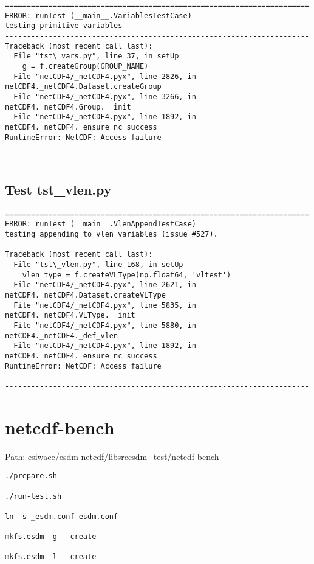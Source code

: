 \begin{verbatim}
======================================================================
ERROR: runTest (__main__.VariablesTestCase)
testing primitive variables
----------------------------------------------------------------------
Traceback (most recent call last):
  File "tst\_vars.py", line 37, in setUp
    g = f.createGroup(GROUP_NAME)
  File "netCDF4/_netCDF4.pyx", line 2826, in netCDF4._netCDF4.Dataset.createGroup
  File "netCDF4/_netCDF4.pyx", line 3266, in netCDF4._netCDF4.Group.__init__
  File "netCDF4/_netCDF4.pyx", line 1892, in netCDF4._netCDF4._ensure_nc_success
RuntimeError: NetCDF: Access failure

----------------------------------------------------------------------
\end{verbatim}

\section{Test tst\_vlen.py}

\begin{verbatim}
======================================================================
ERROR: runTest (__main__.VlenAppendTestCase)
testing appending to vlen variables (issue #527).
----------------------------------------------------------------------
Traceback (most recent call last):
  File "tst\_vlen.py", line 168, in setUp
    vlen_type = f.createVLType(np.float64, 'vltest')
  File "netCDF4/_netCDF4.pyx", line 2621, in netCDF4._netCDF4.Dataset.createVLType
  File "netCDF4/_netCDF4.pyx", line 5835, in netCDF4._netCDF4.VLType.__init__
  File "netCDF4/_netCDF4.pyx", line 5880, in netCDF4._netCDF4._def_vlen
  File "netCDF4/_netCDF4.pyx", line 1892, in netCDF4._netCDF4._ensure_nc_success
RuntimeError: NetCDF: Access failure

----------------------------------------------------------------------
\end{verbatim}

\chapter{netcdf-bench}

Path: esiwace/esdm-netcdf/libsrcesdm\_test/netcdf-bench

\begin{verbatim}
./prepare.sh

./run-test.sh

ln -s _esdm.conf esdm.conf

mkfs.esdm -g --create

mkfs.esdm -l --create
\end{verbatim}

